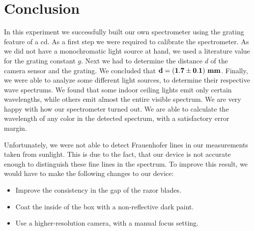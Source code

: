 \section{Conclusion}
    In this experiment we successfully built our own spectrometer using the grating feature of a cd.
    As a first step we were required to calibrate the spectrometer.
    As we did not have a monochromatic light source at hand, we used a literature value for the grating
    constant $g$. Next we had to determine the distance $d$ of the camera sensor and the grating.
    We concluded that $\bf d = (1.7 \pm 0.1) ~\si{\bf\milli\meter}$.
    Finally, we were able to analyze some different light sources, to determine their respective wave spectrums.
    We found that some indoor ceiling lights emit only certain wavelengths, while others emit almost the entire
    visible spectrum.
    We are very happy with how our spectrometer turned out. We are able to calculate the wavelength of any color
    in the detected spectrum, with a satisfactory error margin.

    Unfortunately, we were not able to detect Frauenhofer lines in our measurements taken from sunlight.
    This is due to the fact, that our device is not accurate enough to distinguish these fine lines in the spectrum.
    To improve this result, we would have to make the following changes to our device:
    \begin{itemize}
        \item Improve the consistency in the gap of the razor blades.
        \item Coat the inside of the box with a non-reflective dark paint.
        \item Use a higher-resolution camera, with a manual focus setting.
    \end{itemize}

